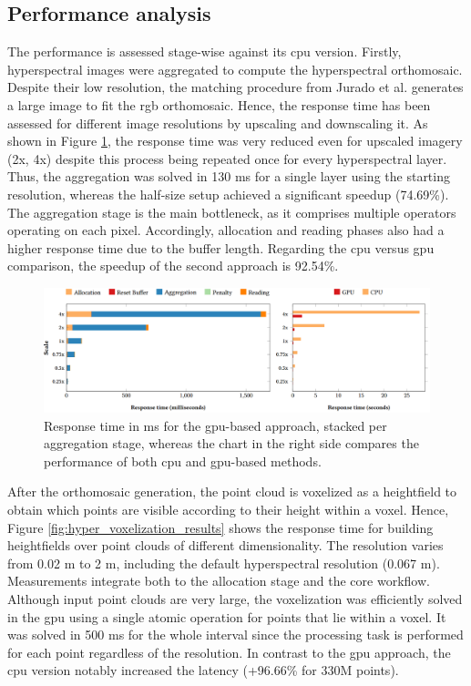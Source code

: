 \subsection{Performance analysis}

The performance is assessed stage-wise against its \acrshort{cpu} version. Firstly, hyperspectral images were aggregated to compute the hyperspectral orthomosaic. Despite their low resolution, the matching procedure from Jurado et al. \cite{jurado_efficient_2022} generates a large image to fit the \acrshort{rgb} orthomosaic. Hence, the response time has been assessed for different image resolutions by upscaling and downscaling it. As shown in Figure \ref{fig:hyper_aggregation_results}, the response time was very reduced even for upscaled imagery (2x, 4x) despite this process being repeated once for every hyperspectral layer. Thus, the aggregation was solved in 130 \si{\milli\second} for a single layer using the starting resolution, whereas the half-size setup achieved a significant speedup (74.69\%). The aggregation stage is the main bottleneck, as it comprises multiple operators operating on each pixel. Accordingly, allocation and reading phases also had a higher response time due to the buffer length. Regarding the \acrshort{cpu} versus \acrshort{gpu} comparison, the speedup of the second approach is 92.54\%.

\begin{figure}[bt]
    \centering
    \includegraphics[width=\linewidth]{figs/hyper_point_cloud/hyper_aggregation_performance.png}
    \caption{Response time in \si{\milli\second} for the \acrshort{gpu}-based approach, stacked per aggregation stage, whereas the chart in the right side compares the performance of both \acrshort{cpu} and \acrshort{gpu}-based methods.}
    \label{fig:hyper_aggregation_results}
\end{figure}

After the orthomosaic generation, the point cloud is voxelized as a heightfield to obtain which points are visible according to their height within a voxel. Hence, Figure \ref{fig:hyper_voxelization_results} shows the response time for building heightfields over point clouds of different dimensionality. The resolution varies from 0.02 \si{\meter} to 2 \si{\meter}, including the default hyperspectral resolution (0.067 \si{\meter}). Measurements integrate both to the allocation stage and the core workflow. Although input point clouds are very large, the voxelization was efficiently solved in the \acrshort{gpu} using a single atomic operation for points that lie within a voxel. It was solved in 500 \si{\milli\second} for the whole interval since the processing task is performed for each point regardless of the resolution. In contrast to the \acrshort{gpu} approach, the \acrshort{cpu} version notably increased the latency (+96.66\% for 330M points).

